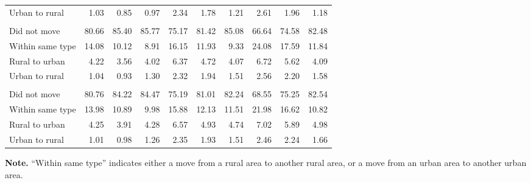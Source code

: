 \documentclass[12pt,letterpaper]{article}
\begin{document}
\begin{table}[hp]
\begin{threeparttable}
\begin{tabular}{l  D{.}{.}{2,2} D{.}{.}{2,2} D{.}{.}{2,2} D{.}{.}{2,2} D{.}{.}{2,2} D{.}{.}{2,2} D{.}{.}{2,2} D{.}{.}{2,2} D{.}{.}{2,2} }
Urban to rural  &        1.03&        0.85&        0.97&        2.34&        1.78&        1.21&        2.61&        1.96&        1.18\\
\addlinespace 
{} \\
Did not move    &       80.66&       85.40&       85.77&       75.17&       81.42&       85.08&       66.64&       74.58&       82.48\\
Within same type&       14.08&       10.12&        8.91&       16.15&       11.93&        9.33&       24.08&       17.59&       11.84\\
Rural to urban  &        4.22&        3.56&        4.02&        6.37&        4.72&        4.07&        6.72&        5.62&        4.09\\
Urban to rural  &        1.04&        0.93&        1.30&        2.32&        1.94&        1.51&        2.56&        2.20&        1.58\\
\addlinespace 
{} \\
Did not move    &       80.76&       84.22&       84.47&       75.19&       81.01&       82.24&       68.55&       75.25&       82.54\\
Within same type&       13.98&       10.89&        9.98&       15.88&       12.13&       11.51&       21.98&       16.62&       10.82\\
Rural to urban  &        4.25&        3.91&        4.28&        6.57&        4.93&        4.74&        7.02&        5.89&        4.98\\
Urban to rural  &        1.01&        0.98&        1.26&        2.35&        1.93&        1.51&        2.46&        2.24&        1.66\\
\bottomrule
\end{tabular}
\begin{tablenotes} 
\scriptsize
\item \hspace*{-0.5em} \textbf{Note.}
``Within same type'' indicates either a move from a rural area to another rural area,
or a move from an urban area to another urban area.
\end{tablenotes}
\end{threeparttable}
\end{table}
\end{document}
